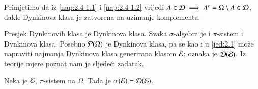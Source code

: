 \begin{nap} \label{nap:2.4-2}
    Primjetimo da iz \ref{nap:2.4-1.1} i \ref{nap:2.4-1.2} vrijedi $A \in \mathcal{D} \implies A^c = \Omega \setminus A \in \mathcal{D}$, dakle Dynkinova klasa je zatvorena na uzimanje komplementa.
\end{nap}

Presjek Dynkinovih klasa je Dynkinova klasa.
Svaka $\sigma$-algebra je i $\pi$-sistem i Dynkinova klasa.
Posebno $\mathcal{P}({\Omega})$ je Dynkinova klasa, pa se kao i u \eqref{jed:2.1} mo\v ze napraviti najmanja Dynkinova klasa generirana klasom $\mathcal{E}$; oznaka je $\mathcal{D}({\mathcal{E}})$.
Iz teorije mjere poznat nam je sljede\' ci zadatak.

\begin{zad}   \label{zad:2.5}
    Neka je $\mathcal{E}$, $\pi$-sistem na $\Omega$.
    Tada je $\sigma({\mathcal{E}}) = \mathcal{D}({\mathcal{E}})$.    
\end{zad}

